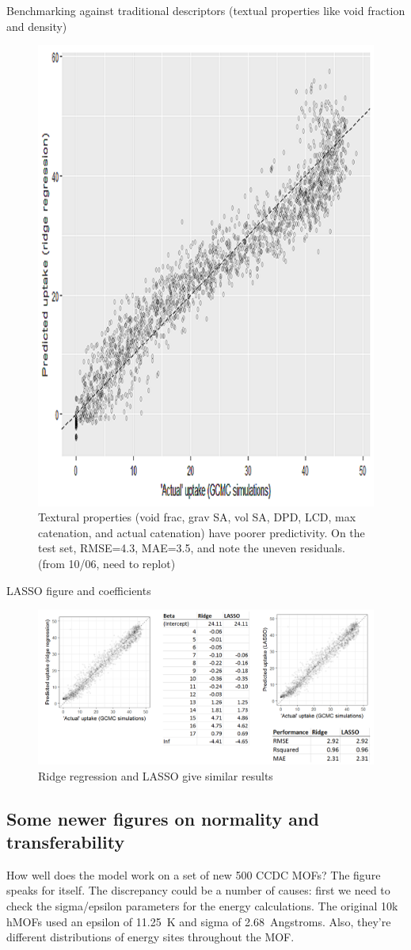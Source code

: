 \documentclass[letterpaper]{article}
\begin{document}
\begin{outline}
	\1 Benchmarking against traditional descriptors (textual properties like void fraction and density)
	\begin{figure}[H]
		\centering
		\includegraphics[width=0.5\columnwidth]{Figs/textural_prediction.png}
		\caption{Textural properties (void frac, grav SA, vol SA, DPD, LCD, max catenation, and actual catenation) have poorer predictivity.  On the test set, RMSE=4.3, MAE=3.5, and note the uneven residuals. (from 10/06, need to replot)}
		\label{fig:textural}
	\end{figure}
	\1 LASSO figure and coefficients
	\begin{figure}[H]
		\centering
		\includegraphics[width=0.75\columnwidth]{Figs/ridge_vs_lasso.png}
		\caption{Ridge regression and LASSO give similar results}
		\label{fig:lasso}
	\end{figure}
	
\end{outline}


\subsection{Some newer figures on normality and transferability}
How well does the model work on a set of new 500 CCDC MOFs?  The figure speaks for itself.  The discrepancy could be a number of causes: first we need to check the sigma/epsilon parameters for the energy calculations.  The original 10k hMOFs used an epsilon of 11.25~K and sigma of 2.68~Angstroms.  Also, they're different distributions of energy sites throughout the MOF.
\end{document}
